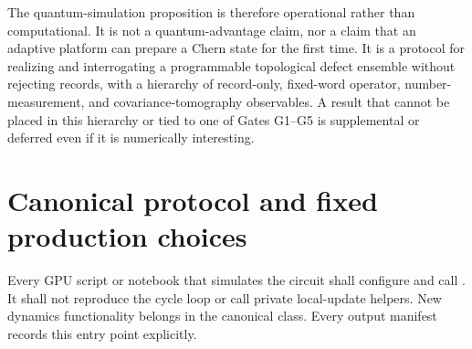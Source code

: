 \documentclass[aps,prx,twocolumn,floatfix,nofootinbib,superscriptaddress,longbibliography]{revtex4-2}
\begin{document}
The quantum-simulation proposition is therefore operational rather than computational.
It is not a quantum-advantage claim, nor a claim that an adaptive platform can prepare a
Chern state for the first time.  It is a protocol for realizing and interrogating a
programmable topological defect ensemble without rejecting records, with a hierarchy of
record-only, fixed-word operator, number-measurement, and covariance-tomography observables.  A result
that cannot be placed in this hierarchy or tied to one of Gates G1--G5 is supplemental or
deferred even if it is numerically interesting.

\section{Canonical protocol and fixed production choices}

Every GPU script or notebook that simulates the circuit shall configure and call
.  It shall not reproduce the cycle loop or
call private local-update helpers.  New dynamics functionality belongs in the canonical
class.  Every output manifest records this entry point explicitly.
\end{document}
